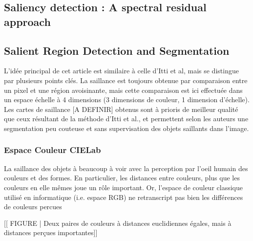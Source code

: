 \documentclass[12pt,a4paper]{article}
\begin{document}
\subsection{Saliency detection : A spectral residual approach}

\subsection{Salient Region Detection and Segmentation}

L'idée principal de cet article est similaire à celle d'Itti et al, mais se distingue par plusieurs points clés. La saillance est toujours obtenue par comparaison entre un pixel et une région avoisinante, mais cette comparaison est ici effectuée dans un espace échelle à 4 dimensions (3 dimensions de couleur, 1 dimension d'échelle). Les cartes de saillance [A DEFINIR] obtenus sont à prioris de meilleur qualité que ceux résultant de la méthode d'Itti et al., et permettent selon les auteurs une segmentation peu couteuse et sans supervisation des objets saillants dans l'image. 

\subsubsection{Espace Couleur CIELab}
La saillance des objets à beaucoup à voir avec la perception par l'oeil humain des couleurs et des formes. En particulier, les distances entre couleurs, plus que les couleurs en elle mêmes joue un rôle important. Or, l'espace de couleur classique utilisé en informatique (i.e. espace RGB) ne retranscript pas bien les différences de couleurs percues

[[ FIGURE | Deux paires de couleurs à distances euclidiennes égales, mais à distances perçues importantes]]
\end{document}

